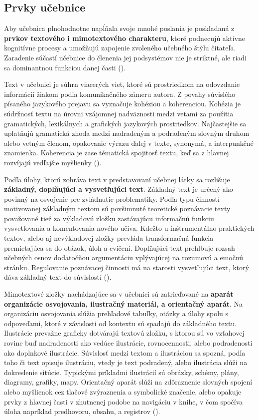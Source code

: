 \subsection{Prvky učebnice}
Aby učebnica plnohodnotne napĺňala svoje mnohé poslania je poskladaná z \textbf{prvkov textového i mimotextového charakteru}, ktoré podnecujú aktívne kognitívne procesy a umožňujú zapojenie zvoleného učebného štýlu čitateľa. Zaradenie súčastí učebnice do členenia jej podsystémov nie je striktné, ale riadi sa dominantnou funkciou danej časti (\cite{zujev_ako_1986}).

Text v učebnici je súhrn viacerých viet, ktoré sú prostriedkom na odovzdanie informácií žiakom podľa komunikačného zámeru autora. Z povahy súvislého písaného jazykového prejavu sa vyznačuje kohéziou a koherenciou. Kohézia je súdržnosť textu na úrovni vzájomnej nadväznosti medzi vetami za použitia gramatických, lexikálnych a grafických jazykových prostriedkov. Najčastejšie sa uplatňujú gramatická zhoda medzi nadradeným a podradeným slovným druhom alebo vetným členom, opakovanie výrazu ďalej v texte, synonymá, a interpunkčné znamienka. Koherencia je zase tématická spojitosť textu, keď sa z hlavnej rozvíjajú vedľajšie myšlienky   (\cite{gavora_ziak_1992}). 

Podľa úlohy, ktorú zohráva text v predstavovaní učebnej látky sa rozlišuje \textbf{základný, doplňujúci a vysvetľujúci text}. Základný text je určený ako povinný na osvojenie pre zvládnutie problematiky. Podľa typu činností motivovanej základným textom sú povšimnuté teoretické poznávacie texty považované tiež za výkladovú zložku zastávajúcu informačnú funkciu vysvetľovania a komentovania nového učiva. Kdežto u inštrumentálno-praktických textov, alebo aj nevýkladovej zložky prevláda transformačná funkcia premietajúca sa do otázok, úloh a cvičení. Doplňujúci text prehlbuje rozsah učebných osnov dodatočňou argumentáciu vplývajúcej na rozumovú a emočnú stránku. Regulovanie poznávacej činnosti má na starosti vysvetľujúci text, ktorý dáva základný text do súvislostí (\cite{zujev_ako_1986}).

Mimotextové zložky nachádzajúce sa v učebnici sú zatrieďované na \textbf{aparát organizácie osvojovania, ilustračný materiál, a orientačný aparát}. Na organizáciu osvojovania slúžia prehľadové tabuľky, otázky a úlohy spolu s odpoveďami, ktoré v závislosti od kontextu sú spadajú do základného textu. Ilustrácie prevažne graficky dotvárajú textovú zložku, s ktorou sú vo vzťahovej rovine buď nadradenosti ako vedúce ilustrácie, rovnocennosti, alebo podradenosti ako doplnkové ilustrácie. Súvislosť medzi textom a ilustráciou sa spozná, podľa toho či text opisuje ilustráciu, vtedy je text podradený, alebo ilustrácia slúži na dokreslenie sitúcie. Typickými príkladmi ilustrácií sú obrázky, schémy, plány, diagramy, grafiky, mapy. Orientačný aparát slúži na zdôraznenie slovných spojení alebo myšlienok cez tlačové zvýraznenia a symbolické značenie, alebo opakuje prvky z hlavnej časti v zhutnenej podobe na navigáciu v knihe, v čom spočíva úloha napríklad predhovoru, obsahu, a registrov (\cite{zujev_ako_1986}).

